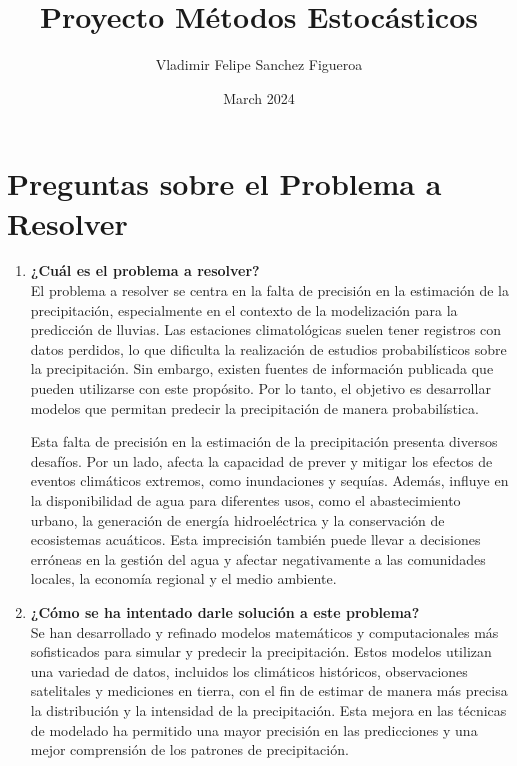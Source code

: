 \documentclass{article}
\title{Proyecto Métodos Estocásticos}
\author{Vladimir Felipe Sanchez Figueroa}
\date{March 2024}
\begin{document}
\maketitle

\section{Preguntas sobre el Problema a Resolver}

\begin{enumerate}
    \item \textbf{¿Cuál es el problema a resolver?} \\

     El problema a resolver se centra en la falta de precisión en la estimación de la precipitación, especialmente en el contexto de la modelización para la predicción de lluvias. Las estaciones climatológicas suelen tener registros con datos perdidos, lo que dificulta la realización de estudios probabilísticos sobre la precipitación. Sin embargo, existen fuentes de información publicada que pueden utilizarse con este propósito. Por lo tanto, el objetivo es desarrollar modelos que permitan predecir la precipitación de manera probabilística.
    

    Esta falta de precisión en la estimación de la precipitación presenta diversos desafíos. Por un lado, afecta la capacidad de prever y mitigar los efectos de eventos climáticos extremos, como inundaciones y sequías. Además, influye en la disponibilidad de agua para diferentes usos, como el abastecimiento urbano, la generación de energía hidroeléctrica y la conservación de ecosistemas acuáticos. Esta imprecisión también puede llevar a decisiones erróneas en la gestión del agua y afectar negativamente a las comunidades locales, la economía regional y el medio ambiente.
    

  

    
    \item \textbf{¿Cómo se ha intentado darle solución a este problema?}\\

    Se han desarrollado y refinado modelos matemáticos y computacionales más sofisticados para simular y predecir la precipitación. Estos modelos utilizan una variedad de datos, incluidos los climáticos históricos, observaciones satelitales y mediciones en tierra, con el fin de estimar de manera más precisa la distribución y la intensidad de la precipitación. Esta mejora en las técnicas de modelado ha permitido una mayor precisión en las predicciones y una mejor comprensión de los patrones de precipitación.


\end{enumerate}
\end{document}
